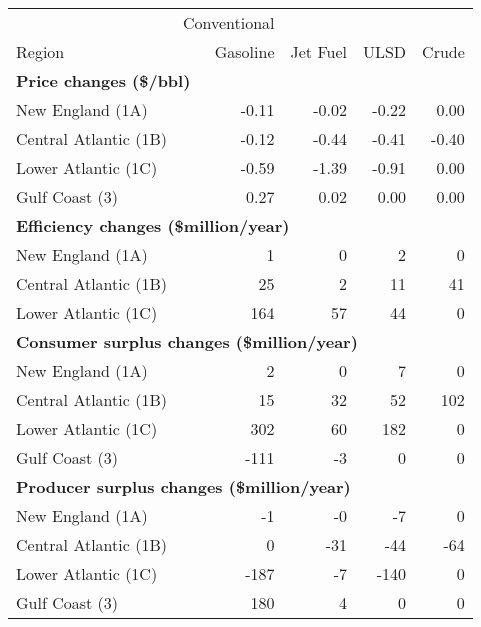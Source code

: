 \begin{tabular}{lrrrr}
  \hline
   & Conventional & &  & \\

                    Region & Gasoline & Jet Fuel & ULSD & Crude \\ 
                    \midrule \multicolumn{5}{l}{\textbf{Price changes (\$/bbl)}} \\
New England (1A) & -0.11 & -0.02 & -0.22 & 0.00 \\ 
  Central Atlantic (1B) & -0.12 & -0.44 & -0.41 & -0.40 \\ 
  Lower Atlantic (1C) & -0.59 & -1.39 & -0.91 & 0.00 \\ 
  Gulf Coast (3) & 0.27 & 0.02 & 0.00 & 0.00 \\ 
   \midrule \multicolumn{5}{l}{\textbf{Efficiency changes (\$million/year)}} \\
New England (1A) & 1 & 0 & 2 & 0 \\ 
  Central Atlantic (1B) & 25 & 2 & 11 & 41 \\ 
  Lower Atlantic (1C) & 164 & 57 & 44 & 0 \\ 
   \midrule \multicolumn{5}{l}{\textbf{Consumer surplus changes (\$million/year)}} \\
New England (1A) & 2 & 0 & 7 & 0 \\ 
  Central Atlantic (1B) & 15 & 32 & 52 & 102 \\ 
  Lower Atlantic (1C) & 302 & 60 & 182 & 0 \\ 
  Gulf Coast (3) & -111 & -3 & 0 & 0 \\ 
   \midrule \multicolumn{5}{l}{\textbf{Producer surplus changes (\$million/year)}} \\
New England (1A) & -1 & -0 & -7 & 0 \\ 
  Central Atlantic (1B) & 0 & -31 & -44 & -64 \\ 
  Lower Atlantic (1C) & -187 & -7 & -140 & 0 \\ 
  Gulf Coast (3) & 180 & 4 & 0 & 0 \\ 
   \hline
\end{tabular}
